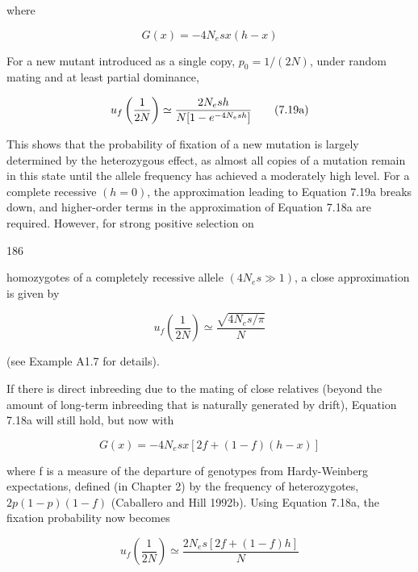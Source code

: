 \documentclass{article}
\begin{document}
where

\begin{equation}
G(x)=-4N_{e}s x(h-x)
\tag{7.18b}
\label{eq:7_18b}
\end{equation}

For a new mutant introduced as a single copy,  $ p_0 = 1/(2N) $, under random mating and at least partial dominance,

\begin{equation}
\begin{align*}u_f\left({1\over2N}\right)\simeq{2N_e sh\over N[1-e^{-4N_e sh}]}\end{align*}
\tag{7.19a}
\label{eq:7_19a}
\end{equation}

This shows that the probability of fixation of a new mutation is largely determined by the heterozygous effect, as almost all copies of a mutation remain in this state until the allele frequency has achieved a moderately high level. For a complete recessive  $ (h = 0) $, the approximation leading to Equation 7.19a breaks down, and higher-order terms in the approximation of Equation 7.18a are required. However, for strong positive selection on

186

homozygotes of a completely recessive allele  $ (4N_e s \gg 1) $, a close approximation is given by

\begin{equation}
u_{f}\left(\frac{1}{2N}\right)\simeq\frac{\sqrt{4N_{e}s/\pi}}{N}
\tag{7.19b}
\label{eq:7_19b}
\end{equation}

(see Example A1.7 for details).

If there is direct inbreeding due to the mating of close relatives (beyond the amount of long-term inbreeding that is naturally generated by drift), Equation 7.18a will still hold, but now with

\begin{equation}
G(x)=-4N_{e}s x[2f+(1-f)(h-x)]
\tag{7.20a}
\label{eq:7_20a}
\end{equation}

where f is a measure of the departure of genotypes from Hardy-Weinberg expectations, defined (in Chapter 2) by the frequency of heterozygotes,  $ 2p(1-p)(1-f) $ (Caballero and Hill 1992b). Using Equation 7.18a, the fixation probability now becomes

\begin{equation}
u_{f}\left(\frac{1}{2N}\right)\simeq\frac{2N_{e}s[2f+(1-f)h]}{N}
\tag{7.20b}
\label{eq:7_20b}
\end{equation}
\end{document}
